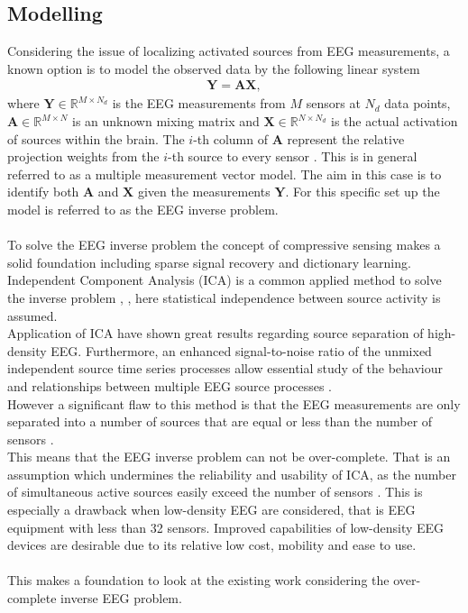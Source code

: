 \subsection{Modelling}
Considering the issue of localizing activated sources from EEG measurements, a known option is to model the observed data by the following linear system 
\begin{align*}
\mathbf{Y} = \mathbf{AX},
\end{align*}
where $\mathbf{Y} \in \mathbb{R}^{M \times N_d}$ is the EEG measurements from $M$ sensors at $N_d$ data points, $\mathbf{A} \in \mathbb{R}^{M \times N}$ is an unknown mixing matrix and $\mathbf{X} \in \mathbb{R}^{N \times N_d}$ is the actual activation of sources within the brain. 
The $i$-th column of $\mathbf{A}$ represent the relative projection weights from the $i$-th source to every sensor \cite{phd2015}. 
This is in general referred to as a multiple measurement vector model. 
The aim in this case is to identify both $\mathbf{A}$ and $\mathbf{X}$ given the measurements $\mathbf{Y}$. 
For this specific set up the model is referred to as the EEG inverse problem.  
\\ \\
To solve the EEG inverse problem the concept of compressive sensing makes a solid foundation including sparse signal recovery and dictionary learning. 
Independent Component Analysis (ICA) is a common applied method to solve the inverse problem \cite{Scott1996}, \cite{Scott1997}, here statistical independence between source activity is assumed. 
\\
Application of ICA have shown great results regarding source separation of high-density EEG. 
Furthermore, an enhanced signal-to-noise ratio of the unmixed independent source time series processes allow essential study of the behaviour and relationships between multiple EEG source processes \cite{Arnaud2012}. 
\\
However a significant flaw to this method is that the EEG measurements are only separated into a number of sources that are equal or less than the number of sensors \cite{Balkan2015}.
\\
This means that the EEG inverse problem can not be over-complete. 
That is an assumption which undermines the reliability and usability of ICA, as the number of simultaneous active sources easily exceed the number of sensors \cite{phd2015}. 
This is especially a drawback when low-density EEG are considered, that is EEG equipment with less than 32 sensors. 
Improved capabilities of low-density EEG devices are desirable due to its relative low cost, mobility and ease to use. 
\\ \\
This makes a foundation to look at the existing work considering the over-complete inverse EEG problem. 


